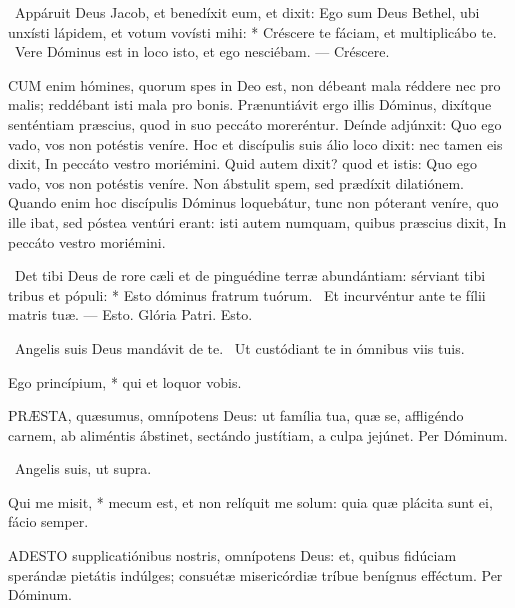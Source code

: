 \R\ Appáruit Deus Jacob, et benedíxit eum, et dixit: Ego sum Deus Bethel, ubi unxísti lápidem, et votum vovísti mihi: * Créscere te fáciam, et multiplicábo te. \V\ Vere Dóminus est in loco isto, et ego nesciébam. --- Créscere.


\lettrine[lines=2]{C}{UM} enim hómines, quorum spes in Deo est, non débeant mala réddere nec pro malis; reddébant isti mala pro bonis. Prænuntiávit ergo illis Dóminus, dixítque senténtiam præscius, quod in suo peccáto moreréntur. Deínde adjúnxit: Quo ego vado, vos non potéstis veníre. Hoc et discípulis suis álio loco dixit: nec tamen eis dixit, In peccáto vestro moriémini. Quid autem dixit? quod et istis: Quo ego vado, vos non potéstis veníre. Non ábstulit spem, sed prædíxit dilatiónem. Quando enim hoc discípulis Dóminus loquebátur, tunc non póterant veníre, quo ille ibat, sed póstea ventúri erant: isti autem numquam, quibus præscius dixit, In peccáto vestro moriémini.

\R\ Det tibi Deus de rore cæli et de pinguédine terræ abundántiam: sérviant tibi tribus et pópuli: * Esto dóminus fratrum tuórum. \V\ Et incurvéntur ante te fílii matris tuæ. --- Esto. Glória Patri. Esto.

\V\ Angelis suis Deus mandávit de te. \R\ Ut custódiant te in ómnibus viis tuis.

 Ego princípium, * qui et loquor vobis.


\lettrine[lines=2]{P}{RÆSTA}, quæsumus, omnípotens Deus: ut família tua, quæ se, affligéndo carnem, ab aliméntis ábstinet, sectándo justítiam, a culpa jejúnet. Per Dóminum.

\V\ Angelis suis, ut supra.

 Qui me misit, * mecum est, et non relíquit me solum: quia quæ plácita sunt ei, fácio semper.


\lettrine[lines=2]{A}{DESTO} supplicatiónibus nostris, omnípotens Deus: et, quibus fidúciam sperándæ pietátis indúlges; consuétæ misericórdiæ tríbue benígnus efféctum. Per Dóminum.

\sectionornament




